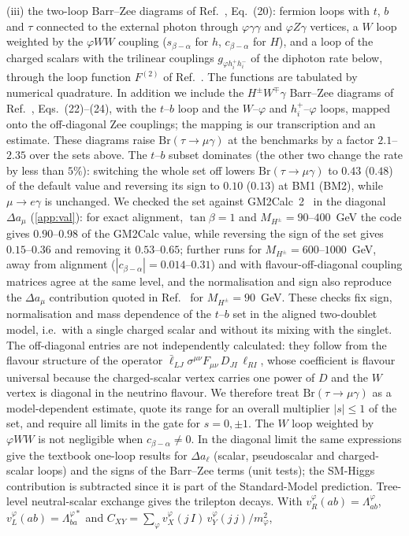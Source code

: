 \documentclass[twocolumn,epjc3]{svjour3}
\newcommand{\Br}{\mathrm{Br}}
\begin{document}
(iii) the two-loop Barr--Zee diagrams of Ref.~\cite{Omura:2015nja}, Eq.~(20): fermion loops with $t$, $b$ and $\tau$ connected to the external photon through $\varphi\gamma\gamma$ and $\varphi Z\gamma$ vertices, a $W$ loop weighted by the $\varphi WW$ coupling ($s_{\beta-\alpha}$ for $h$, $c_{\beta-\alpha}$ for $H$), and a loop of the charged scalars with the trilinear couplings $g_{\varphi h_i^+h_i^-}$ of the diphoton rate below, through the loop function $F^{(2)}$ of Ref.~\cite{Ilisie:2015tra}. The functions are tabulated by numerical quadrature. In addition we include the $H^\pm W^\mp\gamma$ Barr--Zee diagrams of Ref.~\cite{Ilisie:2015tra}, Eqs.~(22)--(24), with the $t$--$b$ loop and the $W$--$\varphi$ and $h_i^+$--$\varphi$ loops, mapped onto the off-diagonal Zee couplings; the mapping is our transcription and an estimate. These diagrams raise $\Br(\tau\to\mu\gamma)$ at the benchmarks by a factor $2.1$--$2.35$ over the sets above. The $t$--$b$ subset dominates (the other two change the rate by less than $5\%$): switching the whole set off lowers $\Br(\tau\to\mu\gamma)$ to $0.43$ ($0.48$) of the default value and reversing its sign to $0.10$ ($0.13$) at BM1 (BM2), while $\mu\to e\gamma$ is unchanged. We checked the set against GM2Calc~2~\cite{Athron:2021evk} in the diagonal $\Delta a_\mu$ (\ref{app:val}): for exact alignment, $\tan\beta=1$ and $M_{H^\pm}=90$--$400$~GeV the code gives $0.90$--$0.98$ of the GM2Calc value, while reversing the sign of the set gives $0.15$--$0.36$ and removing it $0.53$--$0.65$; further runs for $M_{H^\pm}=600$--$1000$~GeV, away from alignment ($|c_{\beta-\alpha}|=0.014$--$0.31$) and with flavour-off-diagonal coupling matrices agree at the same level, and the normalisation and sign also reproduce the $\Delta a_\mu$ contribution quoted in Ref.~\cite{Ilisie:2015tra} for $M_{H^\pm}=90$~GeV. These checks fix sign, normalisation and mass dependence of the $t$--$b$ set in the aligned two-doublet model, i.e.\ with a single charged scalar and without its mixing with the singlet. The off-diagonal entries are not independently calculated: they follow from the flavour structure of the operator $\bar\ell_{LJ}\sigma^{\mu\nu}F_{\mu\nu}\,D_{JI}\,\ell_{RI}$, whose coefficient is flavour universal because the charged-scalar vertex carries one power of $D$ and the $W$ vertex is diagonal in the neutrino flavour. We therefore treat $\Br(\tau\to\mu\gamma)$ as a model-dependent estimate, quote its range for an overall multiplier $|s|\le1$ of the set, and require all limits in the gate for $s=0,\pm1$. The $W$ loop weighted by $\varphi WW$ is not negligible when $c_{\beta-\alpha}\ne0$. In the diagonal limit the same expressions give the textbook one-loop results for $\Delta a_\ell$ (scalar, pseudoscalar and charged-scalar loops) and the signs of the Barr--Zee terms (unit tests); the SM-Higgs contribution is subtracted since it is part of the Standard-Model prediction. Tree-level neutral-scalar exchange gives the trilepton decays. With $v^\varphi_R(ab)=\Lambda^\varphi_{ab}$, $v^\varphi_L(ab)=\Lambda^{\varphi*}_{ba}$ and $C_{XY}=\sum_\varphi v^\varphi_X(j\,I)\,v^\varphi_Y(j\,j)/m_\varphi^2$,
\end{document}

